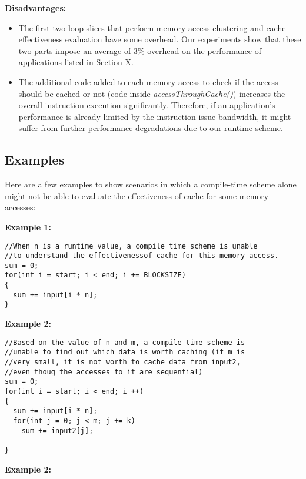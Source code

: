 {\bf Disadvantages: }

\begin{itemize}

\item The first two loop slices that perform memory access clustering and cache effectiveness evaluation have some
overhead. Our experiments show that these two parts impose an average of 3\% overhead on the performance of applications
listed in Section X.

\item The additional code added to each memory access to check if the access should be cached or not (code inside {\it
accessThroughCache()}) increases the overall instruction execution significantly. Therefore, if an application's
performance is already limited by the instruction-issue bandwidth, it might suffer from further performance degradations
due to our runtime scheme.

\end{itemize}


\subsection{Examples}

Here are a few examples to show scenarios in which a compile-time scheme alone might not be able to evaluate the
effectiveness of cache for some memory accesses:

{\bf Example 1:} 

{\footnotesize
\begin{verbatim}
//When n is a runtime value, a compile time scheme is unable 
//to understand the effectivenessof cache for this memory access.
sum = 0;
for(int i = start; i < end; i += BLOCKSIZE)
{
  sum += input[i * n];	
}
\end{verbatim}
}



{\bf Example 2:} 

{\footnotesize
\begin{verbatim}
//Based on the value of n and m, a compile time scheme is 
//unable to find out which data is worth caching (if m is 
//very small, it is not worth to cache data from input2, 
//even thoug the accesses to it are sequential)
sum = 0;
for(int i = start; i < end; i ++)
{
  sum += input[i * n];
  for(int j = 0; j < m; j += k)
    sum += input2[j];
	
}
\end{verbatim}
}

{\bf Example 2:} 



